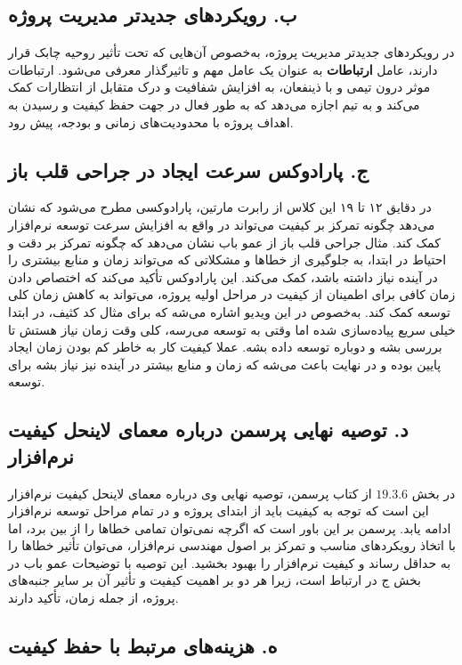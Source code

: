 \subsection*{ب. رویکردهای جدیدتر مدیریت پروژه}

در رویکردهای جدیدتر مدیریت پروژه، به‌خصوص آن‌هایی که تحت تأثیر روحیه چابک قرار دارند، عامل \textbf{ارتباطات} به عنوان یک عامل مهم و تاثیرگذار معرفی می‌شود. ارتباطات موثر درون تیمی و با ذینفعان، به افزایش شفافیت و درک متقابل از انتظارات کمک می‌کند و به تیم اجازه می‌دهد که به طور فعال در جهت حفظ کیفیت و رسیدن به اهداف پروژه با محدودیت‌های زمانی و بودجه، پیش رود.

\subsection*{ج. پارادوکس سرعت ایجاد در جراحی قلب باز}

در دقایق ۱۲ تا ۱۹ این کلاس از رابرت مارتین، پارادوکسی مطرح می‌شود که نشان می‌دهد چگونه تمرکز بر کیفیت می‌تواند در واقع به افزایش سرعت توسعه نرم‌افزار کمک کند. مثال جراحی قلب باز از عمو باب نشان می‌دهد که چگونه تمرکز بر دقت و احتیاط در ابتدا، به جلوگیری از خطاها و مشکلاتی که می‌تواند زمان و منابع بیشتری را در آینده نیاز داشته باشد، کمک می‌کند. این پارادوکس تأکید می‌کند که اختصاص دادن زمان کافی برای اطمینان از کیفیت در مراحل اولیه پروژه، می‌تواند به کاهش زمان کلی توسعه کمک کند. به‌خصوص در این ویدیو اشاره می‌شه که برای مثال کد کثیف، در ابتدا خیلی سریع پیاده‌سازی شده اما وقتی به توسعه می‌رسه، کلی وقت زمان نیاز هستش تا بررسی بشه و دوباره توسعه داده بشه. عملا کیفیت کار به خاطر کم بودن زمان ایجاد پایین بوده و در نهایت باعث می‌شه که زمان و منابع بیشتر در آینده نیز نیاز بشه برای توسعه.

\subsection*{د. توصیه نهایی پرسمن درباره معمای لاینحل کیفیت نرم‌افزار}

در بخش
$19.3.6$
 از کتاب پرسمن، توصیه نهایی وی درباره معمای لاینحل کیفیت نرم‌افزار این است که توجه به کیفیت باید از ابتدای پروژه و در تمام مراحل توسعه نرم‌افزار ادامه یابد. پرسمن بر این باور است که اگرچه نمی‌توان تمامی خطاها را از بین برد، اما با اتخاذ رویکردهای مناسب و تمرکز بر اصول مهندسی نرم‌افزار، می‌توان تأثیر خطاها را به حداقل رساند و کیفیت نرم‌افزار را بهبود بخشید. این توصیه با توضیحات عمو باب در بخش ج در ارتباط است، زیرا هر دو بر اهمیت کیفیت و تأثیر آن بر سایر جنبه‌های پروژه، از جمله زمان، تأکید دارند.

\subsection*{ه. هزینه‌های مرتبط با حفظ کیفیت}

